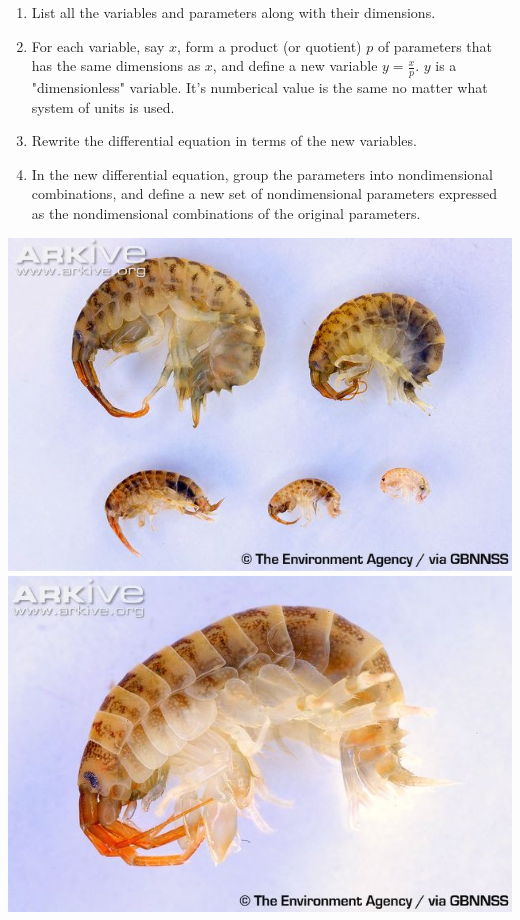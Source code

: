\documentclass[12pt,letterpaper]{amsart}
\theoremstyle{plain}
\theoremstyle{definition}
\numberwithin{equation}{section}
\begin{document}
\begin{enumerate}
\item
List all the variables and parameters along with their dimensions.
\item
For each variable, say $x$, form a product (or quotient) $p$ of parameters that has the same dimensions as $x$, and define a new variable $y=\frac{x}{p}.$ $y$ is a "dimensionless" variable. It's numberical  value is the same no matter what system of units is used.
\item Rewrite the differential equation in terms of the new variables.
\item 
In the new differential equation, group the parameters into nondimensional combinations, and define a new set of nondimensional parameters expressed as the nondimensional combinations of the original parameters. 
\end{enumerate}

\includegraphics[scale=.75]{shrimpy1}\\


\includegraphics[scale=.75]{shrimpy2}\\
\end{document}
